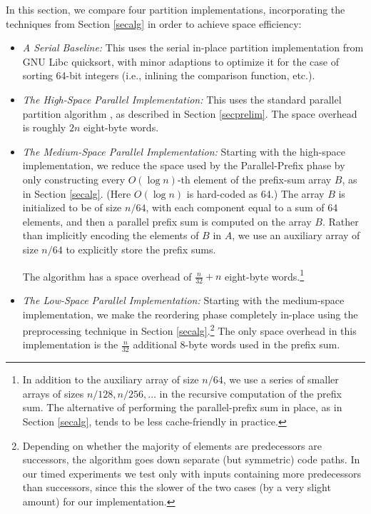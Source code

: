 \documentclass[sigplan, 10pt, nonacm]{acmart}
\theoremstyle{remark}
\theoremstyle{remark}
\begin{document}
In this section, we compare four partition implementations,
incorporating the techniques from Section \ref{secalg} in order to
achieve space efficiency:
\begin{itemize}[leftmargin = .15in]
\item \emph{A Serial Baseline:} This uses the serial in-place
  partition implementation from GNU Libc quicksort, with minor
  adaptions to optimize it for the case of sorting 64-bit integers
  (i.e., inlining the comparison function, etc.).
\item \emph{The High-Space Parallel Implementation:} This uses the
  standard parallel partition algorithm \cite{Blelloch96,AcarBl16}, as
  described in Section \ref{secprelim}. The space overhead is roughly
  $2n$ eight-byte words.
\item \emph{The Medium-Space Parallel Implementation:} Starting with
  the high-space implementation, we reduce the space used by the
  Parallel-Prefix phase by only constructing every $O(\log n)$-th
  element of the prefix-sum array $B$, as in Section
  \ref{secalg}. (Here $O(\log n)$ is hard-coded as 64.) The array $B$
  is initialized to be of size $n / 64$, with each component equal to
  a sum of 64 elements, and then a parallel prefix sum is computed on
  the array $B$. Rather than implicitly encoding the elements of $B$ in
  $A$, we use an auxiliary array of size $n / 64$ to explicitly store
  the prefix sums.

  The algorithm
  has a space overhead of $\frac{n}{32} + n$ eight-byte
  words.\footnote{In addition to the auxiliary array of size $n / 64$,
    we use a series of smaller arrays of sizes $n / 128, n / 256,
    \ldots$ in the recursive computation of the prefix sum. The
    alternative of performing the parallel-prefix sum in place, as in
    Section \ref{secalg}, tends to be less cache-friendly in
    practice.}
\item \emph{The Low-Space Parallel Implementation:}
Starting with the medium-space implementation, we make the reordering
phase completely in-place using the preprocessing technique in Section
\ref{secalg}.\footnote{Depending on whether the majority of elements
  are predecessors are successors, the algorithm goes down separate
  (but symmetric) code paths. In our timed experiments we test only
  with inputs containing more predecessors than successors, since this
  the slower of the two cases (by a very slight amount) for our
  implementation.} The only space overhead in this implementation is
the $\frac{n}{32}$ additional 8-byte words used in the prefix sum.
\end{itemize}
\end{document}
